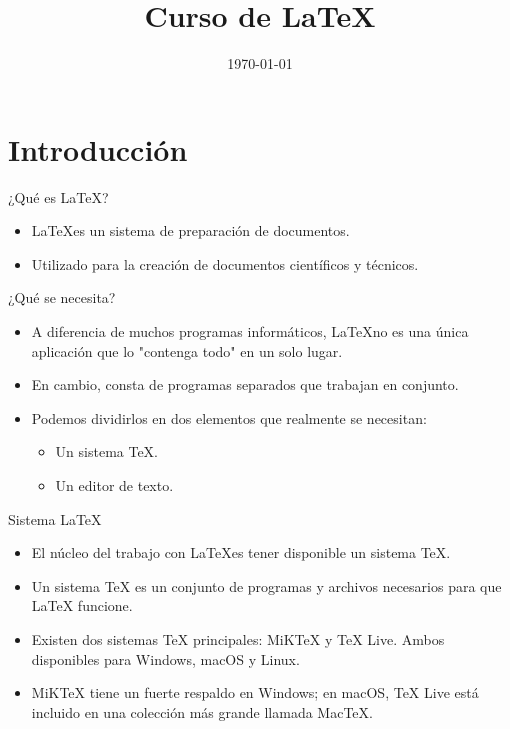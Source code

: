 \documentclass[12pt]{beamer}
\title{Curso de \LaTeX}
\date{\today}
\begin{document}
\begin{frame}
\titlepage
\end{frame}

\begin{frame}
\tableofcontents
\end{frame}

\section{Introducción}
\begin{frame}{¿Qué es \LaTeX?}
  \begin{itemize}
    \item \LaTeX es un sistema de preparación de documentos.
    \item<2-> Utilizado para la creación de documentos científicos y técnicos.
  \end{itemize}
\end{frame}

\begin{frame}{¿Qué se necesita?}
  \begin{itemize}
    \item A diferencia de muchos programas informáticos, \LaTeX no es una única aplicación que lo "contenga todo" en un solo lugar.
    \item<2-> En cambio, consta de programas separados que trabajan en conjunto.
    \item<3-> Podemos dividirlos en dos elementos que realmente se necesitan:
    \begin{itemize}
      \item<4-> Un sistema TeX.
      \item<5-> Un editor de texto.
    \end{itemize}
  \end{itemize}  
\end{frame}

\begin{frame}{Sistema \LaTeX}
  \begin{itemize}
    \item El núcleo del trabajo con \LaTeX es tener disponible un sistema TeX. 
    \item Un sistema TeX es un conjunto de programas y archivos necesarios para que LaTeX funcione.
    \item Existen dos sistemas TeX principales: MiKTeX y TeX Live. Ambos disponibles para Windows, macOS y Linux.
    \item MiKTeX tiene un fuerte respaldo en Windows; en macOS, TeX Live está incluido en una colección más grande llamada MacTeX.
  \end{itemize}
\end{frame}
\end{document}
